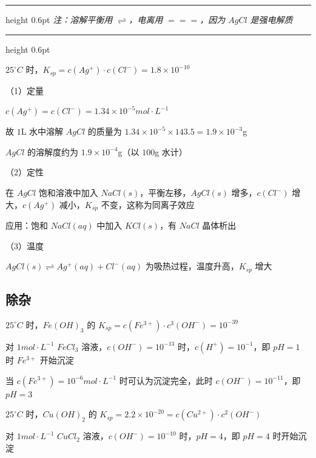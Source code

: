 \documentclass[UTF8,zihao=-4,openany]{ctexbook}
\newenvironment{notebox}
  {\par\smallskip\noindent\begingroup\begin{minipage}{\linewidth}\color{noteframe}\hrule height 0.6pt\smallskip\color{black}\itshape}
  {\par\smallskip\color{noteframe}\hrule height 0.6pt\end{minipage}\endgroup\par\smallskip}
\begin{document}
\begin{notebox}
注：溶解平衡用 $\rightleftharpoons$，电离用 $=\!=\!=$，因为 $AgCl$ 是强电解质\par
\end{notebox}
$25^{\circ}C$ 时，$K_{sp}=c(Ag^+)\cdot c(Cl^-)=1.8\times10^{-10}$\par

（1）定量\par

$c(Ag^+)=c(Cl^-)=1.34\times10^{-5}mol\cdot L^{-1}$\par

故 $1$L 水中溶解 $AgCl$ 的质量为 $1.34\times10^{-5}\times143.5=1.9\times10^{-3}$g\par

$AgCl$ 的溶解度约为 $1.9\times10^{-4}$g（以 $100$g 水计）\par

（2）定性\par

在 $AgCl$ 饱和溶液中加入 $NaCl(s)$，平衡左移，$AgCl(s)$ 增多，$c(Cl^-)$ 增大，$c(Ag^+)$ 减小，$K_{sp}$ 不变，这称为同离子效应\par

应用：饱和 $NaCl(aq)$ 中加入 $KCl(s)$，有 $NaCl$ 晶体析出\par

（3）温度\par

$AgCl(s)\rightleftharpoons Ag^+(aq)+Cl^-(aq)$ 为吸热过程，温度升高，$K_{sp}$ 增大\par
\subsection{除杂}
$25^{\circ}C$ 时，$Fe(OH)_3$ 的 $K_{sp}=c(Fe^{3+})\cdot c^3(OH^-)=10^{-39}$\par

对 $1mol\cdot L^{-1}$ $FeCl_3$ 溶液，$c(OH^-)=10^{-13}$ 时，$c(H^+)=10^{-1}$，即 $pH=1$ 时 $Fe^{3+}$ 开始沉淀\par

当 $c(Fe^{3+})=10^{-6}mol\cdot L^{-1}$ 时可认为沉淀完全，此时 $c(OH^-)=10^{-11}$，即 $pH=3$\par

$25^{\circ}C$ 时，$Cu(OH)_2$ 的 $K_{sp}=2.2\times10^{-20}=c(Cu^{2+})\cdot c^2(OH^-)$\par

对 $1mol\cdot L^{-1}$ $CuCl_2$ 溶液，$c(OH^-)=10^{-10}$ 时，$pH=4$，即 $pH=4$ 时开始沉淀\par
\end{document}
